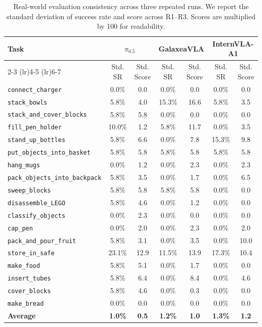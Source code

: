\begin{table}[t]
\centering
\caption{Real-world evaluation consistency across three repeated runs. We report the standard deviation of success rate and score across R1--R3. Scores are multiplied by 100 for readability.}
\label{tab:real_world_consistency_std}
\scriptsize
\setlength{\tabcolsep}{4pt}
\begin{tabular}{lcccccc}
\toprule
\multirow{2}{*}{Task}
& \multicolumn{2}{c}{$\pi_{0.5}$}
& \multicolumn{2}{c}{GalaxeaVLA}
& \multicolumn{2}{c}{InternVLA-A1} \\
\cmidrule(lr){2-3} \cmidrule(lr){4-5} \cmidrule(lr){6-7}
& Std. SR & Std. Score
& Std. SR & Std. Score
& Std. SR & Std. Score \\
\midrule
\texttt{connect\_charger} & 0.0\% & 0.0 & 0.0\% & 0.0 & 0.0\% & 0.0 \\
\texttt{stack\_bowls} & 5.8\% & 4.0 & 15.3\% & 16.6 & 5.8\% & 3.5 \\
\texttt{stack\_and\_cover\_blocks} & 5.8\% & 5.8 & 0.0\% & 0.0 & 0.0\% & 0.0 \\
\texttt{fill\_pen\_holder} & 10.0\% & 1.2 & 5.8\% & 11.7 & 0.0\% & 3.5 \\
\texttt{stand\_up\_bottles} & 5.8\% & 6.6 & 0.0\% & 7.8 & 15.3\% & 9.8 \\
\texttt{put\_objects\_into\_basket} & 5.8\% & 5.8 & 5.8\% & 5.8 & 5.8\% & 5.8 \\
\texttt{hang\_mugs} & 0.0\% & 1.2 & 0.0\% & 2.3 & 0.0\% & 2.3 \\
\texttt{pack\_objects\_into\_backpack} & 5.8\% & 3.5 & 0.0\% & 1.7 & 0.0\% & 6.5 \\
\texttt{sweep\_blocks} & 5.8\% & 5.8 & 5.8\% & 5.8 & 0.0\% & 0.0 \\
\texttt{disassemble\_LEGO} & 5.8\% & 4.6 & 0.0\% & 1.2 & 0.0\% & 0.0 \\
\texttt{classify\_objects} & 0.0\% & 2.3 & 0.0\% & 0.0 & 0.0\% & 0.0 \\
\texttt{cap\_pen} & 0.0\% & 2.0 & 0.0\% & 2.3 & 0.0\% & 2.0 \\
\texttt{pack\_and\_pour\_fruit} & 5.8\% & 3.1 & 0.0\% & 3.5 & 0.0\% & 10.0 \\
\texttt{store\_in\_safe} & 23.1\% & 12.9 & 11.5\% & 13.9 & 17.3\% & 10.4 \\
\texttt{make\_food} & 5.8\% & 5.1 & 0.0\% & 1.7 & 0.0\% & 0.0 \\
\texttt{insert\_tubes} & 5.8\% & 6.4 & 0.0\% & 8.4 & 0.0\% & 4.6 \\
\texttt{cover\_blocks} & 5.8\% & 4.6 & 0.0\% & 0.3 & 0.0\% & 0.0 \\
\texttt{make\_bread} & 0.0\% & 0.0 & 0.0\% & 0.0 & 0.0\% & 0.0 \\
\midrule
\textbf{Average} & \textbf{1.0\%} & \textbf{0.5} & \textbf{1.2\%} & \textbf{1.0} & \textbf{1.3\%} & \textbf{1.2} \\
\bottomrule
\end{tabular}
\end{table}
